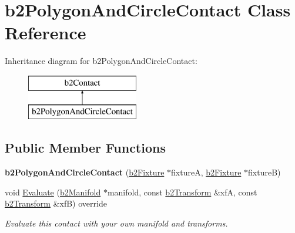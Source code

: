 \hypertarget{classb2PolygonAndCircleContact}{}\section{b2\+Polygon\+And\+Circle\+Contact Class Reference}
\label{classb2PolygonAndCircleContact}
Inheritance diagram for b2\+Polygon\+And\+Circle\+Contact\+:\begin{figure}[H]
\begin{center}
\leavevmode
\includegraphics[height=2.000000cm]{classb2PolygonAndCircleContact}
\end{center}
\end{figure}
\subsection*{Public Member Functions}
\begin{DoxyCompactItemize}
\item 
\mbox{\label{classb2PolygonAndCircleContact_a38158da229eee22253c1f64df1982e40}} 
{\bfseries b2\+Polygon\+And\+Circle\+Contact} (\mbox{\hyperlink{classb2Fixture}{b2\+Fixture}} $\ast$fixtureA, \mbox{\hyperlink{classb2Fixture}{b2\+Fixture}} $\ast$fixtureB)
\item 
\mbox{\label{classb2PolygonAndCircleContact_a4af8338f124be0b7ec704997be4736b1}} 
void \mbox{\hyperlink{classb2PolygonAndCircleContact_a4af8338f124be0b7ec704997be4736b1}{Evaluate}} (\mbox{\hyperlink{structb2Manifold}{b2\+Manifold}} $\ast$manifold, const \mbox{\hyperlink{structb2Transform}{b2\+Transform}} \&xfA, const \mbox{\hyperlink{structb2Transform}{b2\+Transform}} \&xfB) override
\begin{DoxyCompactList}\small\item\em Evaluate this contact with your own manifold and transforms. \end{DoxyCompactList}\end{DoxyCompactItemize}
